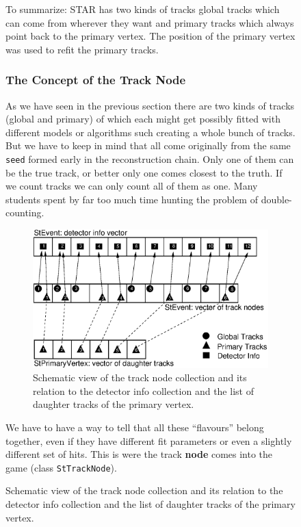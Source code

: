 \documentclass[twoside]{article}
\begin{document}
\begin{figure}[htb]
\begin{center}
To summarize: STAR has two kinds of tracks global tracks which can
come from wherever they want and primary tracks which always point
back to the primary vertex. The position of the primary vertex was
used to refit the primary tracks.

\subsubsection{The Concept of the Track Node}
\label{sec:node}

As we have seen in the previous section there are two kinds of tracks
(global and primary) of which each might get possibly fitted with
different models or algorithms such creating a whole bunch of tracks.
But we have to keep in mind that all come originally from the same
\texttt{seed} formed early in the reconstruction chain. Only one of
them can be the true track, or better only one comes closest to the
truth. If we count tracks we can only count all of them as one.  Many
students spent by far too much time hunting the problem of
double-counting.\\
\begin{figure}[htb]
    \begin{center}
        \includegraphics[width=\textwidth]{nodes.eps}
        \caption{Schematic view of the track node collection and
            its relation to the detector info collection and the list
            of daughter tracks of the primary vertex.}
        \label{fig:nodes}
    \end{center}
\end{figure}
We have to have a way to tell that all these ``flavours'' belong
together, even if they have different fit parameters or even a
slightly different set of hits. This is were the track \textbf{node}
comes into the game (class \texttt{StTrackNode}).


\end{center}
\end{figure}
\end{document}
